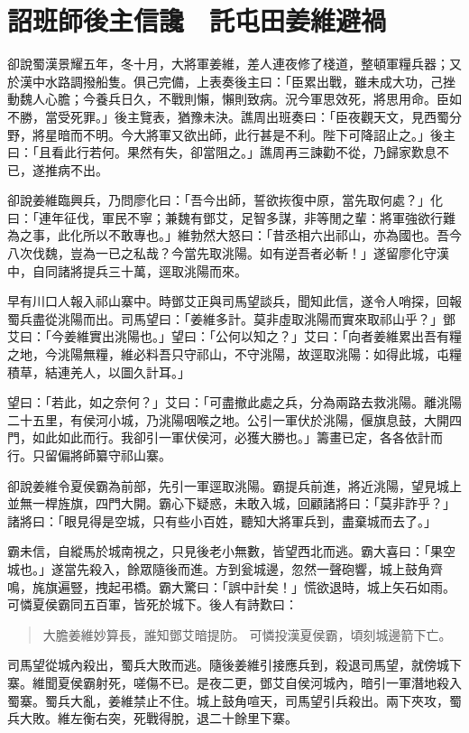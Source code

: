 
\chapter{詔班師後主信讒　託屯田姜維避禍}

卻說蜀漢景耀五年，冬十月，大將軍姜維，差人連夜修了棧道，整頓軍糧兵器；又於漢中水路調撥船隻。俱己完備，上表奏後主曰：「臣累出戰，雖未成大功，己挫動魏人心膽；今養兵日久，不戰則懶，懶則致病。況今軍思效死，將思用命。臣如不勝，當受死罪。」後主覽表，猶豫未決。譙周出班奏曰：「臣夜觀天文，見西蜀分野，將星暗而不明。今大將軍又欲出師，此行甚是不利。陛下可降詔止之。」後主曰：「且看此行若何。果然有失，卻當阻之。」譙周再三諫勸不從，乃歸家歎息不已，遂推病不出。

卻說姜維臨興兵，乃問廖化曰：「吾今出師，誓欲拻復中原，當先取何處？」化曰：「連年征伐，軍民不寧；兼魏有鄧艾，足智多謀，非等閒之輩：將軍強欲行難為之事，此化所以不敢專也。」維勃然大怒曰：「昔丞相六出祁山，亦為國也。吾今八次伐魏，豈為一已之私哉？今當先取洮陽。如有逆吾者必斬！」遂留廖化守漢中，自同諸將提兵三十萬，逕取洮陽而來。

早有川口人報入祁山寨中。時鄧艾正與司馬望談兵，聞知此信，遂令人哨探，回報蜀兵盡從洮陽而出。司馬望曰：「姜維多計。莫非虛取洮陽而實來取祁山乎？」鄧艾曰：「今姜維實出洮陽也。」望曰：「公何以知之？」艾曰：「向者姜維累出吾有糧之地，今洮陽無糧，維必料吾只守祁山，不守洮陽，故逕取洮陽：如得此城，屯糧積草，結連羌人，以圖久計耳。」

望曰：「若此，如之奈何？」艾曰：「可盡撤此處之兵，分為兩路去救洮陽。離洮陽二十五里，有侯河小城，乃洮陽咽喉之地。公引一軍伏於洮陽，偃旗息鼓，大開四門，如此如此而行。我卻引一軍伏侯河，必獲大勝也。」籌畫已定，各各依計而行。只留偏將師纂守祁山寨。

卻說姜維令夏侯霸為前部，先引一軍逕取洮陽。霸提兵前進，將近洮陽，望見城上並無一桿旌旗，四門大開。霸心下疑惑，未敢入城，回顧諸將曰：「莫非詐乎？」諸將曰：「眼見得是空城，只有些小百姓，聽知大將軍兵到，盡棄城而去了。」

霸未信，自縱馬於城南視之，只見後老小無數，皆望西北而逃。霸大喜曰：「果空城也。」遂當先殺入，餘眾隨後而進。方到瓮城邊，忽然一聲砲響，城上鼓角齊鳴，旄旗遍豎，拽起弔橋。霸大驚曰：「誤中計矣！」慌欲退時，城上矢石如雨。可憐夏侯霸同五百軍，皆死於城下。後人有詩歎曰：

\begin{quote}
大膽姜維妙算長，誰知鄧艾暗提防。
可憐投漢夏侯霸，頃刻城邊箭下亡。
\end{quote}

司馬望從城內殺出，蜀兵大敗而逃。隨後姜維引接應兵到，殺退司馬望，就傍城下寨。維聞夏侯霸射死，嗟傷不已。是夜二更，鄧艾自侯河城內，暗引一軍潛地殺入蜀寨。蜀兵大亂，姜維禁止不住。城上鼓角喧天，司馬望引兵殺出。兩下夾攻，蜀兵大敗。維左衡右突，死戰得脫，退二十餘里下寨。


